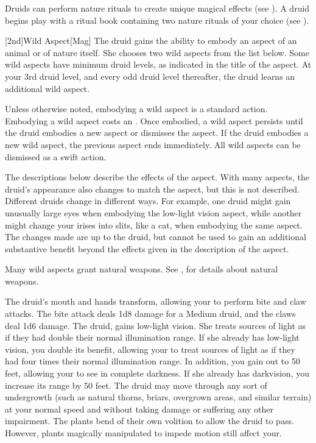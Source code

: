         Druids can perform nature rituals to create unique magical effects (see ).
        A druid begins play with a ritual book containing two nature rituals of your choice (see ).

        [2nd]{Wild Aspect}[Mag]
        The druid gains the ability to embody an aspect of an animal or of nature itself.
        She chooses two wild aspects from the list below.
        Some wild aspects have minimum druid levels, as indicated in the title of the aspect.
        At your 3rd druid level, and every odd druid level thereafter, the druid learns an additional wild aspect.

        Unless otherwise noted, embodying a wild aspect is a standard action.
        Embodying a wild aspect costs an .
        Once embodied, a wild aspect persists until the druid embodies a new aspect or dismisses the aspect.
        If the druid embodies a new wild aspect, the previous aspect ends immediately.
        All wild aspects can be dismissed as a swift action.

        The descriptions below describe the effects of the aspect.
        With many aspects, the druid's appearance also changes to match the aspect, but this is not described.
        Different druids change in different ways.
        For example, one druid might gain unusually large eyes when embodying the low-light vision aspect, while another might change your irises into slits, like a cat, when embodying the same aspect.
        The changes made are up to the druid, but cannot be used to gain an additional substantive benefit beyond the effects given in the description of the aspect.

        Many wild aspects grant natural weapons.
        See , for details about natural weapons.

        The druid's mouth and hands transform, allowing your to perform bite and claw attacks.
        The bite attack deals 1d8 damage for a Medium druid, and the claws deal 1d6 damage.
        The druid, gains low-light vision.
        She treats sources of light as if they had double their normal illumination range.
        If she already has low-light vision, you double its benefit, allowing your to treat sources of light as if they had four times their normal illumination range.
        In addition, you gain  out to 50 feet, allowing your to see in complete darkness.
        If she already has darkvision, you increase its range by 50 feet.
        The druid may move through any sort of undergrowth (such as natural thorns, briars, overgrown areas, and similar terrain) at your normal speed and without taking damage or suffering any other impairment.
        The plants bend of their own volition to allow the druid to pass.
        However, plants magically manipulated to impede motion still affect your.

